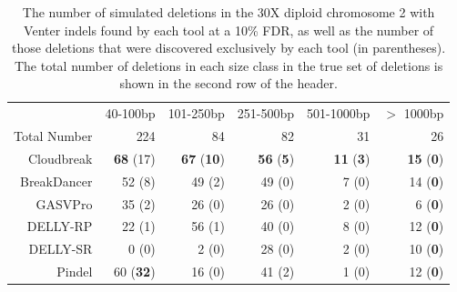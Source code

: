 \begin{table}
\begin{center}
\begin{tabular}{rrrrrr}
 \hline
 & 40-100bp & 101-250bp & 251-500bp & 501-1000bp & $>$ 1000bp \\ 
 Total Number & 224 & 84 & 82 & 31 & 26\\ 
 \hline
 Cloudbreak & \textbf{68} (17) & \textbf{67} (\textbf{10}) & \textbf{56} (\textbf{5}) & \textbf{11} (\textbf{3}) & \textbf{15} (\textbf{0}) \\ 
 BreakDancer & 52 (8) & 49 (2) & 49 (0) & 7 (0) & 14 (\textbf{0}) \\ 
 GASVPro  & 35 (2) & 26 (0) & 26 (0) & 2 (0) & 6 (\textbf{0}) \\ 
 DELLY-RP  & 22 (1) & 56 (1) & 40 (0) & 8 (0) & 12 (\textbf{0}) \\ 
 DELLY-SR  & 0 (0) & 2 (0) & 28 (0) & 2 (0) & 10 (\textbf{0}) \\ 
 Pindel  & 60 (\textbf{32}) & 16 (0) & 41 (2) & 1 (0) & 12 (\textbf{0})\\ 
 \hline
\end{tabular}
\end{center}
\caption{The number of simulated deletions in the 30X diploid chromosome 2 with Venter indels found by each tool at a 10\% FDR, as well as the number of those deletions that were discovered exclusively by each tool (in parentheses). The total number of deletions in each size class in the true set of deletions is shown in the second row of the header.}
\label{chr2DeletionPredsFDR10}
\end{table}

